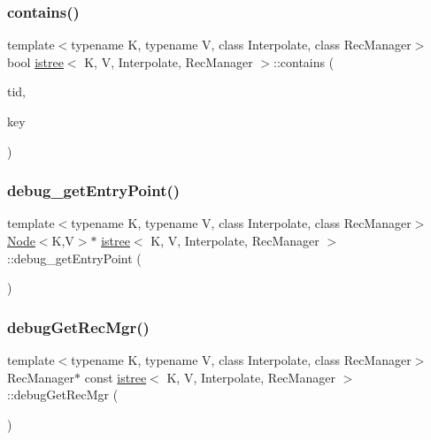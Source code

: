 \subsubsection{\texorpdfstring{contains()}{contains()}}
{\footnotesize\ttfamily template$<$typename K, typename V, class Interpolate, class Rec\+Manager$>$ \\
bool \hyperlink{classistree}{istree}$<$ K, V, Interpolate, Rec\+Manager $>$\+::contains (\begin{DoxyParamCaption}\item[{const int}]{tid,  }\item[{const K \&}]{key }\end{DoxyParamCaption})\hspace{0.3cm}{\ttfamily [inline]}}

\mbox{\label{classistree_ae4fe2d0a0344a0bc5c111707060cd54e}} 
\subsubsection{\texorpdfstring{debug\+\_\+get\+Entry\+Point()}{debug\_getEntryPoint()}}
{\footnotesize\ttfamily template$<$typename K, typename V, class Interpolate, class Rec\+Manager$>$ \\
\hyperlink{classNode}{Node}$<$K,V$>$$\ast$ \hyperlink{classistree}{istree}$<$ K, V, Interpolate, Rec\+Manager $>$\+::debug\+\_\+get\+Entry\+Point (\begin{DoxyParamCaption}{ }\end{DoxyParamCaption})\hspace{0.3cm}{\ttfamily [inline]}}

\mbox{\label{classistree_a1f3d3dfef2900f634a291665c2294e02}} 
\subsubsection{\texorpdfstring{debug\+Get\+Rec\+Mgr()}{debugGetRecMgr()}}
{\footnotesize\ttfamily template$<$typename K, typename V, class Interpolate, class Rec\+Manager$>$ \\
Rec\+Manager$\ast$ const \hyperlink{classistree}{istree}$<$ K, V, Interpolate, Rec\+Manager $>$\+::debug\+Get\+Rec\+Mgr (\begin{DoxyParamCaption}{ }\end{DoxyParamCaption})\hspace{0.3cm}{\ttfamily [inline]}}

